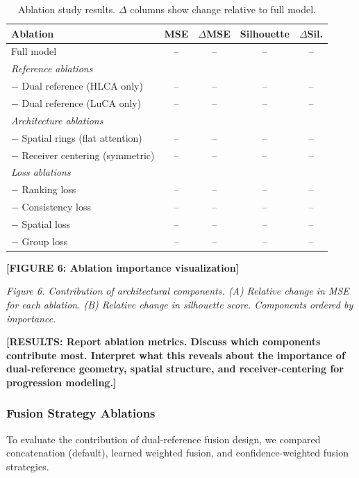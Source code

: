 \begin{table}[h]
\centering
\caption{Ablation study results. $\Delta$ columns show change relative to full model.}
\label{tab:ablations}
\begin{tabular}{lcccc}
\toprule
\textbf{Ablation} & \textbf{MSE} & $\Delta$\textbf{MSE} & \textbf{Silhouette} & $\Delta$\textbf{Sil.} \\
\midrule
Full model & -- & -- & -- & -- \\
\midrule
\multicolumn{5}{l}{\textit{Reference ablations}} \\
$-$ Dual reference (HLCA only) & -- & -- & -- & -- \\
$-$ Dual reference (LuCA only) & -- & -- & -- & -- \\
\midrule
\multicolumn{5}{l}{\textit{Architecture ablations}} \\
$-$ Spatial rings (flat attention) & -- & -- & -- & -- \\
$-$ Receiver centering (symmetric) & -- & -- & -- & -- \\
\midrule
\multicolumn{5}{l}{\textit{Loss ablations}} \\
$-$ Ranking loss & -- & -- & -- & -- \\
$-$ Consistency loss & -- & -- & -- & -- \\
$-$ Spatial loss & -- & -- & -- & -- \\
$-$ Group loss & -- & -- & -- & -- \\
\bottomrule
\end{tabular}
\end{table}

\textbf{[FIGURE 6: Ablation importance visualization]}

\textit{Figure 6. Contribution of architectural components. (A) Relative change in MSE for each ablation. (B) Relative change in silhouette score. Components ordered by importance.}

\textbf{[RESULTS: Report ablation metrics. Discuss which components contribute most. Interpret what this reveals about the importance of dual-reference geometry, spatial structure, and receiver-centering for progression modeling.]}


\subsubsection{Fusion Strategy Ablations}

To evaluate the contribution of dual-reference fusion design, we compared concatenation (default), learned weighted fusion, and confidence-weighted fusion strategies.

